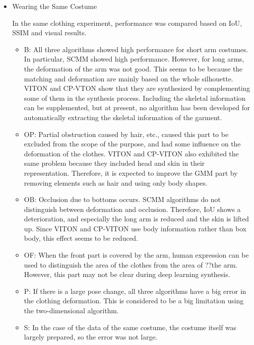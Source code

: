 \begin{itemize}

\item Wearing the Same Costume

In the same clothing experiment, performance was compared based on IoU, SSIM and visual results.

\begin{itemize}

\item B: All three algorithms showed high performance for short arm costumes. In particular, SCMM showed high performance. However, for long arms, the deformation of the arm was not good. This seems to be because the matching and deformation are mainly based on the whole silhouette. VITON and CP-VTON show that they are synthesized by complementing some of them in the synthesis process. Including the skeletal information can be supplemented, but at present, no algorithm has been developed for automatically extracting the skeletal information of the garment.

\item OP: Partial obstruction caused by hair, etc., caused this part to be excluded from the scope of the purpose, and had some influence on the deformation of the clothes. VITON and CP-VITON also exhibited the same problem because they included head and skin in their representation. Therefore, it is expected to improve the GMM part by removing elements such as hair and using only body shapes.
\item OB: Occlusion due to bottoms occurs. SCMM algorithms do not distinguish between deformation and occlusion. Therefore, IoU shows a deterioration, and especially the long arm is reduced and the skin is lifted up. Since VITON and CP-VITON use body information rather than box body, this effect seems to be reduced.


\item OF: When the front part is covered by the arm, human expression can be used to distinguish the area of the clothes from the area of ??the arm. However, this part may not be clear during deep learning synthesis.

\item P: If there is a large pose change, all three algorithms have a big error in the clothing deformation. This is considered to be a big limitation using the two-dimensional algorithm.
\item S: In the case of the data of the same costume, the costume itself was largely prepared, so the error was not large.
\end{itemize}


\end{itemize}
